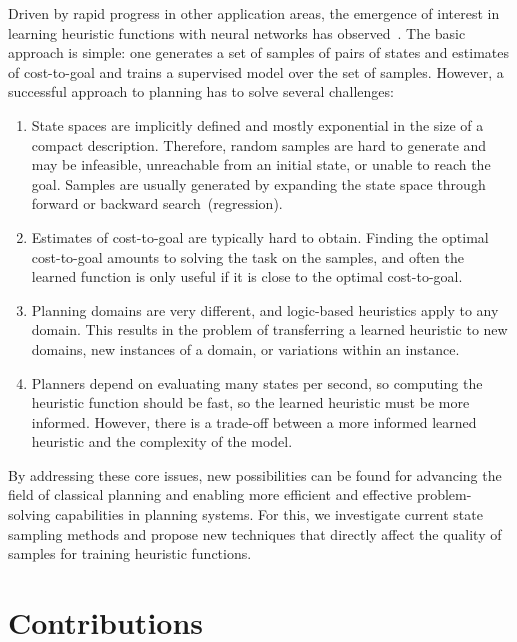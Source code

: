 Driven by rapid progress in other application areas, the emergence of interest in learning heuristic functions with neural networks has observed~\cite{samadi-et-al-aaai2008,Arfaee.etal/2011,Agostinelli.etal/2019,Yu.etal/2020,Shen.etal/2020,Ferber.etal/2020a,Toyer.etal/2020,Ferber.etal/2022,OToole/2022}. The basic approach is simple: one generates a set of samples of pairs of states and estimates of cost-to-goal and trains a supervised model over the set of samples. However, a successful approach to planning has to solve several challenges:

\begin{enumerate}[label=C\arabic*),left=0pt]
    \itemsep0pt
    \item State spaces are implicitly defined and mostly exponential in the size of a compact description. Therefore, random samples are hard to generate and may be infeasible, unreachable from an initial state, or unable to reach the goal. Samples are usually generated by expanding the state space through forward or backward search~(regression).
    \item Estimates of cost-to-goal are typically hard to obtain. Finding the optimal cost-to-goal amounts to solving the task on the samples, and often the learned function is only useful if it is close to the optimal cost-to-goal.
    \item Planning domains are very different, and logic-based heuristics apply to any domain. This results in the problem of transferring a learned heuristic to new domains, new instances of a domain, or variations within an instance.
    \item Planners depend on evaluating many states per second, so computing the heuristic function should be fast, so the learned heuristic must be more informed. However, there is a trade-off between a more informed learned heuristic and the complexity of the model.
\end{enumerate}

By addressing these core issues, new possibilities can be found for advancing the field of classical planning and enabling more efficient and effective problem-solving capabilities in planning systems. For this, we investigate current state sampling methods and propose new techniques that directly affect the quality of samples for training heuristic functions.

\section{Contributions}
\label{sec:contributions}


